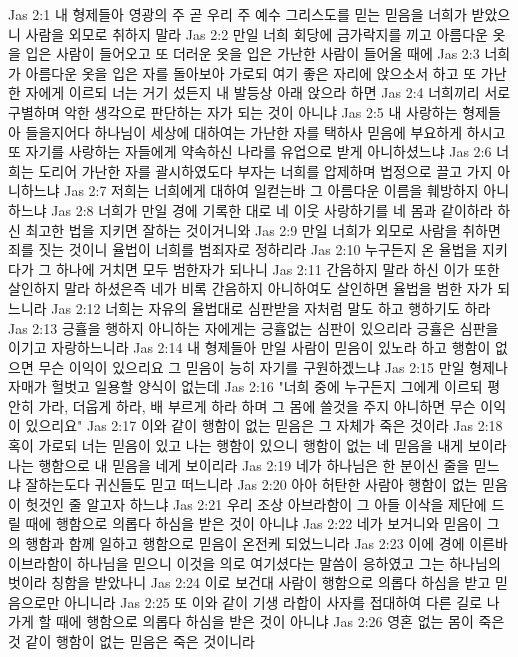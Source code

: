 Jas 2:1  내 형제들아 영광의 주 곧 우리 주 예수 그리스도를 믿는 믿음을 너희가 받았으니 사람을 외모로 취하지 말라
Jas 2:2  만일 너희 회당에 금가락지를 끼고 아름다운 옷을 입은 사람이 들어오고 또 더러운 옷을 입은 가난한 사람이 들어올 때에
Jas 2:3  너희가 아름다운 옷을 입은 자를 돌아보아 가로되 여기 좋은 자리에 앉으소서 하고 또 가난한 자에게 이르되 너는 거기 섰든지 내 발등상 아래 앉으라 하면
Jas 2:4  너희끼리 서로 구별하며 악한 생각으로 판단하는 자가 되는 것이 아니냐
Jas 2:5  내 사랑하는 형제들아 들을지어다 하나님이 세상에 대하여는 가난한 자를 택하사 믿음에 부요하게 하시고 또 자기를 사랑하는 자들에게 약속하신 나라를 유업으로 받게 아니하셨느냐
Jas 2:6  너희는 도리어 가난한 자를 괄시하였도다 부자는 너희를 압제하며 법정으로 끌고 가지 아니하느냐
Jas 2:7  저희는 너희에게 대하여 일컫는바 그 아름다운 이름을 훼방하지 아니하느냐
Jas 2:8  너희가 만일 경에 기록한 대로 네 이웃 사랑하기를 네 몸과 같이하라 하신 최고한 법을 지키면 잘하는 것이거니와
Jas 2:9  만일 너희가 외모로 사람을 취하면 죄를 짓는 것이니 율법이 너희를 범죄자로 정하리라
Jas 2:10  누구든지 온 율법을 지키다가 그 하나에 거치면 모두 범한자가 되나니
Jas 2:11  간음하지 말라 하신 이가 또한 살인하지 말라 하셨은즉 네가 비록 간음하지 아니하여도 살인하면 율법을 범한 자가 되느니라
Jas 2:12  너희는 자유의 율법대로 심판받을 자처럼 말도 하고 행하기도 하라
Jas 2:13  긍휼을 행하지 아니하는 자에게는 긍휼없는 심판이 있으리라 긍휼은 심판을 이기고 자랑하느니라
Jas 2:14  내 형제들아 만일 사람이 믿음이 있노라 하고 행함이 없으면 무슨 이익이 있으리요 그 믿음이 능히 자기를 구원하겠느냐
Jas 2:15  만일 형제나 자매가 헐벗고 일용할 양식이 없는데
Jas 2:16  "너희 중에 누구든지 그에게 이르되 평안히 가라, 더웁게 하라, 배 부르게 하라 하며 그 몸에 쓸것을 주지 아니하면 무슨 이익이 있으리요"
Jas 2:17  이와 같이 행함이 없는 믿음은 그 자체가 죽은 것이라
Jas 2:18  혹이 가로되 너는 믿음이 있고 나는 행함이 있으니 행함이 없는 네 믿음을 내게 보이라 나는 행함으로 내 믿음을 네게 보이리라
Jas 2:19  네가 하나님은 한 분이신 줄을 믿느냐 잘하는도다 귀신들도 믿고 떠느니라
Jas 2:20  아아 허탄한 사람아 행함이 없는 믿음이 헛것인 줄 알고자 하느냐
Jas 2:21  우리 조상 아브라함이 그 아들 이삭을 제단에 드릴 때에 행함으로 의롭다 하심을 받은 것이 아니냐
Jas 2:22  네가 보거니와 믿음이 그의 행함과 함께 일하고 행함으로 믿음이 온전케 되었느니라
Jas 2:23  이에 경에 이른바 이브라함이 하나님을 믿으니 이것을 의로 여기셨다는 말씀이 응하였고 그는 하나님의 벗이라 칭함을 받았나니
Jas 2:24  이로 보건대 사람이 행함으로 의롭다 하심을 받고 믿음으로만 아니니라
Jas 2:25  또 이와 같이 기생 라합이 사자를 접대하여 다른 길로 나가게 할 때에 행함으로 의롭다 하심을 받은 것이 아니냐
Jas 2:26  영혼 없는 몸이 죽은 것 같이 행함이 없는 믿음은 죽은 것이니라
